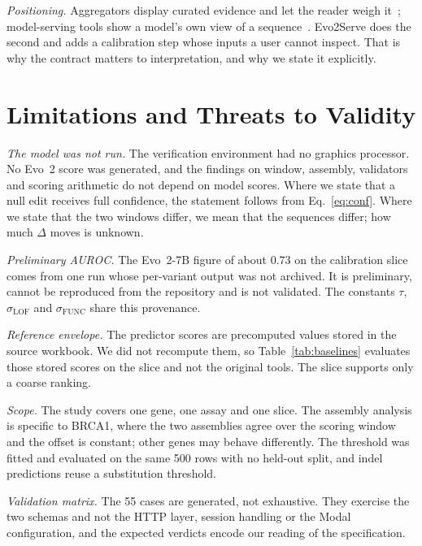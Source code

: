 \documentclass[10pt,journal,a4paper]{IEEEtran}
\begin{document}
\textit{Positioning.} Aggregators display curated evidence and let the reader weigh it~\cite{kopanos2019varsome,baux2021mobidetails}; model-serving tools show a model's own view of a sequence~\cite{pearce2026evee}. Evo2Serve does the second and adds a calibration step whose inputs a user cannot inspect. That is why the contract matters to interpretation, and why we state it explicitly.

\section{Limitations and Threats to Validity}
\label{sec:limits}

\textit{The model was not run.} The verification environment had no graphics processor. No Evo~2 score was generated, and the findings on window, assembly, validators and scoring arithmetic do not depend on model scores. Where we state that a null edit receives full confidence, the statement follows from Eq.~\eqref{eq:conf}. Where we state that the two windows differ, we mean that the sequences differ; how much $\Delta$ moves is unknown.

\textit{Preliminary AUROC.} The Evo~2-7B figure of about 0.73 on the calibration slice comes from one run whose per-variant output was not archived. It is preliminary, cannot be reproduced from the repository and is not validated. The constants $\tau$, $\sigma_{\mathrm{LOF}}$ and $\sigma_{\mathrm{FUNC}}$ share this provenance.

\textit{Reference envelope.} The predictor scores are precomputed values stored in the source workbook. We did not recompute them, so Table~\ref{tab:baselines} evaluates those stored scores on the slice and not the original tools. The slice supports only a coarse ranking.

\textit{Scope.} The study covers one gene, one assay and one slice. The assembly analysis is specific to BRCA1, where the two assemblies agree over the scoring window and the offset is constant; other genes may behave differently. The threshold was fitted and evaluated on the same 500 rows with no held-out split, and indel predictions reuse a substitution threshold.

\textit{Validation matrix.} The 55 cases are generated, not exhaustive. They exercise the two schemas and not the HTTP layer, session handling or the Modal configuration, and the expected verdicts encode our reading of the specification.
\end{document}
